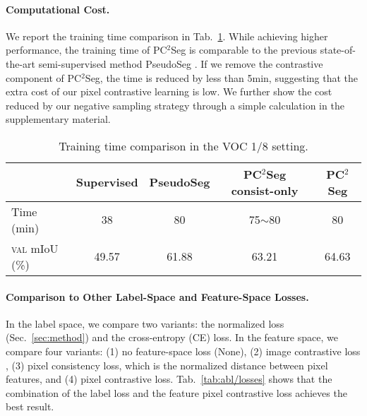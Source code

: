 \paragraph{Computational Cost.}
We report the training time comparison in Tab.~\ref{tab:abl/time}. While achieving higher performance, the training time of PC$^2$Seg is comparable to the previous state-of-the-art semi-supervised method PseudoSeg \cite{zou2020pseudoseg}. If we remove the contrastive component of PC$^2$Seg, the time is reduced by less than 5min, suggesting that the extra cost of our pixel contrastive learning is low.
We further show the cost reduced by our negative sampling strategy through a simple calculation in the supplementary material.

\begin{table}[tb]
\centering
\footnotesize
\caption{Training time comparison in the VOC 1/8 setting.}
\label{tab:abl/time}
\vspace{-5pt}
\setlength{\tabcolsep}{4.5pt}
\begin{tabular}{lcccc}
\toprule
    & {\scriptsize Supervised} & {\scriptsize PseudoSeg} & {\scriptsize PC$^2$Seg consist-only} & {\scriptsize PC$^2$Seg}
       \\
\midrule
    Time (min)
    & 38  & 80  & 75$\sim$80  &  80  \\
    \textsc{val} mIoU (\%)
    & 49.57  & 61.88  & 63.21  &  64.63  \\
\bottomrule
\end{tabular}
\vspace{-10pt}
\end{table}


\paragraph{Comparison to Other Label-Space and Feature-Space Losses.}
In the label space, we compare two variants: the normalized \ltwo loss (Sec.~\ref{sec:method}) and the cross-entropy (CE) loss.
In the feature space, we compare four variants: (1) no feature-space loss (None), (2) image contrastive loss \cite{chen2020simple}, (3) pixel consistency loss, which is the normalized \ltwo distance between pixel features, and (4) pixel contrastive loss. Tab.~\ref{tab:abl/losses} shows that the combination of the label \ltwo loss and the feature pixel contrastive loss achieves the best result.

